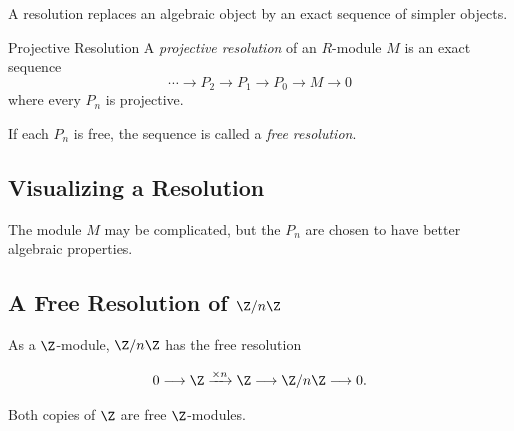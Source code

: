 A resolution replaces an algebraic object by an exact sequence of simpler
objects.

\begin{definitionbox}{Projective Resolution}
A \emph{projective resolution} of an \(R\)-module \(M\) is an exact sequence
\[ \cdots\longrightarrow P_2\longrightarrow P_1
\longrightarrow P_0\longrightarrow M\longrightarrow0 \]
where every \(P_n\) is projective.
\end{definitionbox}

If each \(P_n\) is free, the sequence is called a \emph{free resolution}.

\subsection{Visualizing a Resolution}
\label{subsec:resolution-visual}

\begin{center}
\end{center}

The module \(M\) may be complicated, but the \(P_n\) are chosen to have
better algebraic properties.

\subsection{A Free Resolution of \(\Z/n\Z\)}
\label{subsec:resolution-zn}

As a \(\Z\)-module, \(\Z/n\Z\) has the free resolution

\[ 0\longrightarrow\Z
\xrightarrow{\times n}\Z
\longrightarrow\Z/n\Z
\longrightarrow0. \]

Both copies of \(\Z\) are free \(\Z\)-modules.

